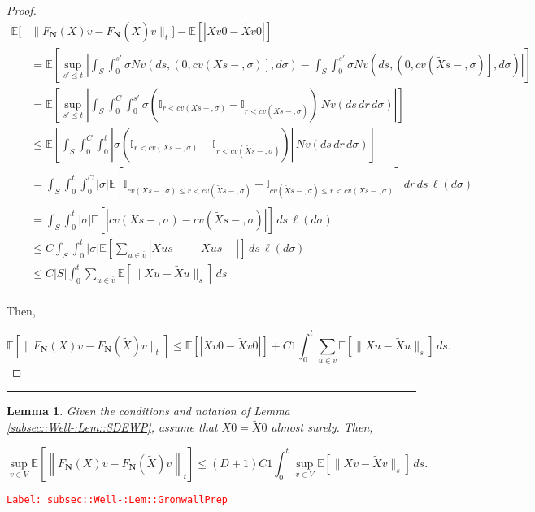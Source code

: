 \documentclass[12pt]{article}
\newcommand{\mb}{\mathbb}
\newcommand{\ov}{\overline}
\newcommand{\tr}{\textcolor{red}}
\newcommand{\labe}[1]{\tr{\texttt{Label: #1}}}
\newcommand{\lin}{\rule{\linewidth}{0.4 pt}}
\newcommand{\ex}[1]{\mb{E}\left[#1\right]}			%
\renewcommand{\v}{v}							%
\newcommand{\vv}{u}								%
\renewcommand{\S}{S}							%
\newcommand{\s}{\sigma}							%
\renewcommand{\t}{t}							%
\renewcommand{\tt}{s}							%
\newcommand{\ttt}{s'}							%
\newcommand{\X}{X}								%
\newcommand{\IGr}{c}							%
\newcommand{\cl}{\ov}							%
\newcommand{\const}{C}							%
\newcommand{\degr}{D}							%
\newcommand{\poisses}{\mathbf{N}}				%
\newcommand{\poiss}{N}							%
\newcommand{\Sm}{\ell}							%
\newcommand{\Fpo}{F_{\poisses}}					%
\renewcommand{\r}{r}							%
\newcommand{\alt}[1]{\widetilde{#1}}			%
\newtheorem{lem}[thms]{Lemma}
\begin{document}
\begin{proof}
\begin{align*}
\mb{E}\bigg[&\|\Fpo(\X{}{}){\v} - \Fpo(\alt{\X}){\v}\|_\t\bigg] - \ex{|\X{\v}{0} - \alt{\X}{\v}{0}|}\\
&= \ex{\sup_{\ttt \leq \t}\left|\int_\S\int_0^{\ttt} \s\poiss{\v}\left(d\tt,\left(0,\IGr{\v}(\X{}{\tt-},\s)\right],d\s\right) -  \int_\S\int_0^{\ttt} \s\poiss{\v}\left(d\tt,\left(0,\IGr{\v}(\alt{\X}{}{\tt-},\s)\right],d\s\right)\right|}\\
&=\ex{\sup_{\ttt\leq \t} \left|\int_\S \int_0^{\const{}} \int_0^{\ttt} \s\left(\mb{I}_{\r < \IGr{\v}(\X{}{\tt-},\s)} - \mb{I}_{\r < \IGr{\v}(\alt{\X}{}{\tt-},\s)}\right)\,\poiss{\v}(d\tt\,d\r\,d\s)\right|}\\
&\leq \ex{\int_\S\int_0^{\const{}}\int_0^\t \left|\s\left(\mb{I}_{\r < \IGr{\v}(\X{}{\tt-},\s)} - \mb{I}_{\r < \IGr{\v}(\alt{\X}{}{\tt-},\s)}\right)\right|\,\poiss{\v}(d\tt\,d\r\,d\s)}\\
&=\int_\S\int_0^\t\int_0^{\const{}} |\s|\ex{\mb{I}_{\IGr{\v}(\X{}{\tt-},\s) \leq \r < \IGr{\v}(\alt{\X}{}{\tt-},\s)} + \mb{I}_{\IGr{\v}(\alt{\X}{}{\tt-},\s) \leq \r < \IGr{\v}(\X{}{\tt-},\s)}}\,d\r\,d\tt\,\Sm(d\s)\\
&= \int_\S\int_0^\t|\s|\ex{\left|\IGr{\v}(\X{}{\tt-},\s) - \IGr{\v}(\alt{\X}{}{\tt-},\s)\right|}\,d\tt\,\Sm(d\s)\\
&\leq \const{}\int_\S\int_0^\t |\s| \ex{\sum_{\vv \in \cl{\v}}|\X{\vv}{\tt-} - \alt{\X}{\vv}{\tt-}|}\,d\tt\,\Sm(d\s)\\
&\leq \const{}|\S|\int_0^\t \sum_{\vv \in \cl{\v}}\ex{\|\X{\vv}{} - \alt{\X}{\vv}{}\|_\tt}\,d\tt\\
\end{align*}

Then,

\[\ex{\|\Fpo(\X{}{}){\v} - \Fpo(\alt{\X}){\v}\|_\t} \leq \ex{|\X{\v}{0} - \alt{\X}{\v}{0}|} +  \const{1}\int_0^\t \sum_{\vv\in \cl{\v}} \ex{\|\X{\vv}{} - \alt{\X}{\vv}{}\|_\tt}\,d\tt.\]

\end{proof}

\lin

\begin{lem}
Given the conditions and notation of Lemma \ref{subsec::Well-:Lem::SDEWP}, assume that \(\X{}{0} = \alt{\X}{}{0}\) almost surely. Then,

\[\sup_{\v \in V} \ex{\left\|\Fpo(\X{}{}){\v} - \Fpo(\alt{\X}{}{}){\v}\right\|_\t} \leq (\degr+1)\const{1}\int_0^\t \sup_{\v \in V} \ex{\|\X{\v}{} - \alt{\X}{\v}{}\|_\tt}\,d\tt.\]
\label{subsec::Well-:Lem::GronwallPrep}
\end{lem}
\labe{subsec::Well-:Lem::GronwallPrep}
\end{document}
